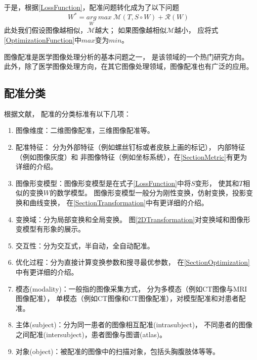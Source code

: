 于是，根据\ref{LossFunction}，配准问题转化成为了以下问题
\begin{equation}\label{OptimizationFunction}
  W^\ast=\underset{W}{arg} \ max \ \mathcal{M}(T,S\circ W)+\mathcal{R}(W)
\end{equation}
此处我们假设图像越相似，$\mathcal{M}$越大；
如果图像越相似$\mathcal{M}$越小，
应将式\ref{OptimizationFunction}中$max$变为$min$。

图像配准是医学图像处理分析的基本问题之一，
是该领域的一个热门研究方向。
此外，除了医学图像处理方向，在其它图像处理领域，图像配准也有广泛的应用。

\subsection{配准分类}\label{RegistrationClassification}
根据文献\cite{RegistrationSurvey,RegistrationSurveyNew}，
配准的分类标准有以下几项：
\begin{enumerate}
  \item 图像维度：二维图像配准，三维图像配准等。
  \item 配准特征：
    分为外部特征（例如螺丝钉标或者皮肤上画的标记），
    内部特征（例如图像灰度）和
    非图像特征（例如坐标系统），在\ref{SectionMetric}有更为详细的介绍。
  \item 图像形变模型：图像形变模型是在式子\ref{LossFunction}中将$S$变形，
    使其和$T$相似的变换$W$的数学模型。
    图像形变模型一般分为刚性变换，仿射变换，投影变换和曲线变换，
    在\ref{SectionTransformation}中有更详细的介绍。
  \item 变换域：分为局部变换和全局变换。
    图\ref{2DTransformation}对变换域和图像形变模型有形象的展示。
  \item 交互性：分为交互式，半自动，全自动配准。
  \item 优化过程：分为直接计算变换参数和搜寻最优参数，
    在\ref{SectionOptimization}中有更详细的介绍。
  \item 模态(modality)：一般指的图像采集方式，
    分为多模态（例如CT图像与MRI图像配准），
    单模态（例如CT图像和CT图像配准），对模型配准和对患者配准。
  \item 主体(subject)：分为同一患者的图像相互配准(intrasubject)，
    不同患者的图像之间配准(intersubject)，患者图像与图谱(atlas)。
  \item 对象(object)：被配准的图像中的扫描对象，包括头胸腹肢体等等。
\end{enumerate}

